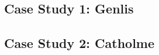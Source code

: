 \documentclass[12pt,fleqn]{article}
\numberwithin{equation}{section}
\begin{document}
\begin{appendix}
\subsection{Case Study 1: Genlis}
\label{app:CS1}
%

\subsection{Case Study 2: Catholme}
\label{app:CS2}
%

%

\end{appendix}

\newpage
\printbibliography
\end{document}
